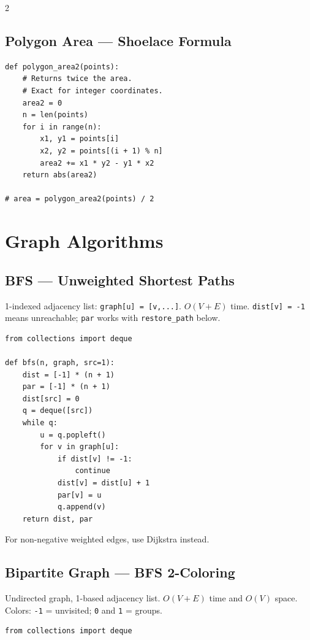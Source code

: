 \documentclass[9pt,a4paper]{extarticle}
\newcommand{\code}[1]{\texttt{#1}}
\begin{document}
\begin{multicols}{2}
\par\noindent\begin{minipage}[t]{\linewidth}
\subsection{Polygon Area --- Shoelace Formula}
\begin{lstlisting}
def polygon_area2(points):
    # Returns twice the area.
    # Exact for integer coordinates.
    area2 = 0
    n = len(points)
    for i in range(n):
        x1, y1 = points[i]
        x2, y2 = points[(i + 1) % n]
        area2 += x1 * y2 - y1 * x2
    return abs(area2)

# area = polygon_area2(points) / 2
\end{lstlisting}
\end{minipage}\par
\section{Graph Algorithms}

\subsection{BFS --- Unweighted Shortest Paths}
1-indexed adjacency list: \code{graph[u] = [v,...]}. $O(V+E)$ time. \code{dist[v] = -1} means unreachable; \code{par} works with \code{restore\_path} below.
\begin{lstlisting}
from collections import deque

def bfs(n, graph, src=1):
    dist = [-1] * (n + 1)
    par = [-1] * (n + 1)
    dist[src] = 0
    q = deque([src])
    while q:
        u = q.popleft()
        for v in graph[u]:
            if dist[v] != -1:
                continue
            dist[v] = dist[u] + 1
            par[v] = u
            q.append(v)
    return dist, par
\end{lstlisting}
For non-negative weighted edges, use Dijkstra instead.

\subsection{Bipartite Graph --- BFS 2-Coloring}
Undirected graph, 1-based adjacency list. $O(V+E)$ time and $O(V)$ space. Colors: \code{-1} = unvisited; \code{0} and \code{1} = groups.
\begin{lstlisting}
from collections import deque


\end{lstlisting}
\end{multicols}
\end{document}
